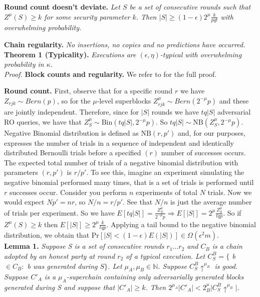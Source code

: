 \documentclass[9pt,a4paper]{article}
\begin{document}
\textbf{Round count doesn't deviate.} \textit{Let $S$ be a set of consecutive rounds such that $Z^\mu(S) \geq k$ for some security parameter $k$. Then $\vert S \vert \geq (1-\epsilon)2^\mu \frac{k}{pqt}$ with overwhelming probability.}

\textbf{Chain regularity.} \textit{No insertions, no copies and no predictions \cite{Backbone} have occurred.}\\

\textbf{Theorem 1 (Typicality).} \textit{Executions are $(\epsilon, \eta)$-typical  with overwhelming probability in $\kappa$.}\\

\textit{Proof.} \textbf{Block counts and regularity.} We refer to \cite{Backbone} for the full proof.

\textbf{Round count.} First, observe that for a specific round $r$ we have $Z_{rjk} \sim Bern(p)$, so for the $\mu$-level superblocks $Z_{rjk}^\mu \sim Bern(2^{-\mu}p)$ and these are jointly independent. Therefore, since for $\vert S \vert$ rounds we have $tq\vert S \vert$ adversarial RO queries, we have that $Z_S^\mu \sim \text{Bin}(tq \vert S \vert, 2^{-\mu}p)$. So $tq \vert S \vert \sim \text{NB}(Z_S^\mu, 2^{-\mu}p)$. Negative Binomial distribution is defined as $\text{NB}(r, p')$ and, for our purposes, expresses the number of trials in a sequence of independent and identically distributed Bernoulli trials before a specified $(r)$ number of successes occurs. The expected total number of trials of a negative binomial distribution with parameters $(r, p')$ is $r/p'$. To see this, imagine an experiment simulating the negative binomial performed many times, that is a set of trials is performed until $r$ successes occur. Consider you perform $n$ experiments of total $N$ trials. Now we would expect $Np' = nr$, so $N/n = r/p'$. See that $N/n$ is just the average number of trials per experiment. So we have $E[tq \vert S \vert] = \frac{Z^\mu_S}{2^{-\mu}p} \Rightarrow E[\vert S \vert] = 2^\mu \frac{Z^\mu_S}{tqp}$. So if $Z^\mu(S) \geq k$ then $E[\vert S \vert] \geq 2^\mu \frac{k}{tqp}$. Applying a tail bound to the negative binomial distribution, we obtain that $\text{Pr}[\vert S \vert < (1 - \epsilon)E(\vert S \vert)] \in \Omega(\epsilon^{2}m)$.  \\

\textbf{Lemma 1.} \textit{Suppose S is a set of consecutive rounds $r_1 ... r_2$ and $C_B$ is a chain adopted by an honest party at round $r_2$ of a typical execution. Let $C^{B}_{S} = \{$ b $\in C_B:$ b was generated during $S\}$. Let $\mu_A, \mu_B \in \mathbb{N}$. Suppose $C^{B}_{S}\uparrow^{\mu_B}$ is good. Suppose $C'_A$ is a $\mu_A$-superchain containing only adversarially generated blocks generated during S and suppose that $\vert C'_A \vert \geq k$. Then $2^{\mu_A} \vert C'_A \vert <  2^\mu_B \vert    C^{B}_{S}\uparrow^{\mu_B}\vert $. }\\
\end{document}
